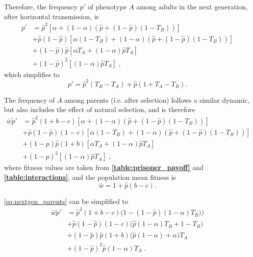\documentclass[12pt]{extarticle}
\begin{document}
Therefore, the frequency $p'$ of phenotype $A$ among adults in the next generation, after horizontal transmission, is 
\begin{equation}\label{eq:nextgen_adults}
\begin{aligned}
p'
& = \hat{p}^2 [\alpha + (1-\alpha)(\hat{p} + (1-\hat{p})(1-T_B))] \\
& + \hat{p}(1-\hat{p}) [\alpha(1-T_B) + (1-\alpha)(\hat{p} + (1-\hat{p})(1-T_B))] \\
& + (1-\hat{p})\hat{p} [\alpha T_A + (1-\alpha) \hat{p} T_A ] \\
& + (1-\hat{p})^2 [(1-\alpha) \hat{p} T_A] \;,
\end{aligned}
\end{equation}
which simplifies to
\begin{equation}\label{eq:nextgen_adults_slimpify}
p' = \hat{p}^2(T_B-T_A) + \hat{p}(1+T_A-T_B) .
\end{equation}

The frequency of $A$ among parents (i.e. after selection) follows a similar dynamic, but also includes the effect of natural selection, and is therefore
\begin{equation}\label{eq:nextgen_parents}
\begin{aligned}
\bar{w} \tilde{p}'
& = \hat{p}^2 (1+b-c) [\alpha + (1-\alpha)(\hat{p} + (1-\hat{p})(1-T_B))] \\
& + \hat{p}(1-\hat{p}) (1-c) [\alpha(1-T_B) + (1-\alpha)(\hat{p} + (1-\hat{p})(1-T_B))] \\
& + (1-\hat{p})\hat{p} (1+b) [\alpha T_A + (1-\alpha) \hat{p} T_A ] \\
& + (1-\hat{p})^2 [(1-\alpha) \hat{p} T_A] \;,
\end{aligned}
\end{equation}
where fitness values are taken from \textbf{\autoref{table:prisoner_payoff}} and \textbf{\autoref{table:interactions}}, and the population mean fitness is
\begin{equation} \label{eq:mean_fitness}
\bar{w} =  1 + \hat{p}(b-c).
\end{equation}

\autoref{eq:nextgen_parents} can be simplified to
\begin{equation}\label{eq:nextgen_parents_simplified}
\begin{aligned}
\bar{w} \tilde{p}'
& = \hat{p}^2 (1+b-c) \big(1-(1-\hat{p})(1-\alpha)T_B)\big) \\
& + \hat{p}(1-\hat{p}) (1-c) \big(\hat{p}(1-\alpha)T_B+1-T_B\big) \\
& + (1-\hat{p})\hat{p} (1+b) \big(\hat{p}(1-\alpha) + \alpha\big) T_A \\
& + (1-\hat{p})^2 \hat{p} (1-\alpha) T_A \;.
\end{aligned}
\end{equation}
\end{document}
